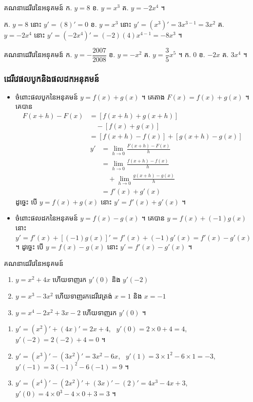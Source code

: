 \begin{example}[លំហាត់គំរូ]
គណនាដេរីវេនៃអនុគមន៍ \quad ក. $y = 8$ \quad ខ. $y = x^3$ \quad គ. $y = -2x^4$ ។
\end{example}
\ans
ក. $y = 8$ នោះ $y' = (8)' = 0$ \quad ខ. $y = x^3$ នោះ $y' = (x^3)' = 3x^{3-1} = 3x^2$ \quad គ. $y = -2x^4$ នោះ $y' = (-2x^4)' = (-2)(4)x^{4-1} = -8x^3$ ។

\begin{pro}
គណនាដេរីវេនៃអនុគមន៍ \quad ក. $y = -\dfrac{2007}{2008}$ \quad ខ. $y = -x^2$ \quad គ. $y = \dfrac{3}{5}x^5$ ។
\ans
ក. $0$ \quad ខ. $-2x$ \quad គ. $3x^4$ ។
\end{pro}

\subsubsection{ដេរីវេផលបូកនិងផលដកអនុគមន៍}

\begin{itemize}
  \item ចំពោះផលបូកនៃអនុគមន៍ $y = f(x) + g(x)$ ។ គេតាង $F(x) = f(x) + g(x)$ ។ គេបាន
  \[ \begin{aligned}
F(x + h) - F(x) &= [f(x + h) + g(x + h)]\\
&\quad - [f(x) + g(x)]\\
&= [f(x + h) - f(x)] + [g(x + h) - g(x)]
\end{aligned} \]
  \[ \begin{aligned}
y' &= \lim_{h \to 0}\frac{F(x + h) - F(x)}{h}\\
&= \lim_{h \to 0}\frac{f(x + h) - f(x)}{h}\\
&\quad + \lim_{h \to 0}\frac{g(x + h) - g(x)}{h}\\
&= f'(x) + g'(x)
\end{aligned} \]
  ដូច្នេះ បើ $y = f(x) + g(x)$ នោះ $y' = f'(x) + g'(x)$ ។
  \item ចំពោះផលដកនៃអនុគមន៍ $y = f(x) - g(x)$ ។ គេបាន $y = f(x) + (-1)g(x)$ នោះ $y' = f'(x) + [(-1)g(x)]' = f'(x) + (-1)g'(x) = f'(x) - g'(x)$ ។ ដូច្នេះ បើ $y = f(x) - g(x)$ នោះ $y' = f'(x) - g'(x)$ ។
\end{itemize}

\begin{example}[លំហាត់គំរូ]
គណនាដេរីវេនៃអនុគមន៍
\begin{enumerate}[a]
  \item $y = x^2 + 4x$ ហើយទាញរក $y'(0)$ និង $y'(-2)$
  \item $y = x^3 - 3x^2$ ហើយទាញរកដេរីវេត្រង់ $x = 1$ និង $x = -1$
  \item $y = x^4 - 2x^2 + 3x - 2$ ហើយទាញរក $y'(0)$ ។
\end{enumerate}
\end{example}
\ans
\begin{enumerate}[a]
  \item $y' = (x^2)' + (4x)' = 2x + 4$, \ $y'(0) = 2\times 0 + 4 = 4$, \ $y'(-2) = 2(-2) + 4 = 0$ ។
  \item $y' = (x^3)' - (3x^2)' = 3x^2 - 6x$, \ $y'(1) = 3\times 1^2 - 6\times 1 = -3$, \ $y'(-1) = 3(-1)^2 - 6(-1) = 9$ ។
  \item $y' = (x^4)' - (2x^2)' + (3x)' - (2)' = 4x^3 - 4x + 3$, \ $y'(0) = 4\times 0^3 - 4\times 0 + 3 = 3$ ។
\end{enumerate}

